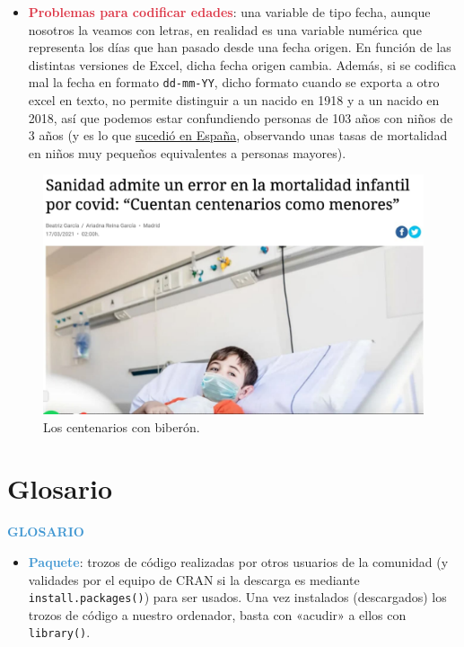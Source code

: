 \documentclass[11pt,]{book}
\providecommand{\tightlist}{%
  \setlength{\itemsep}{0pt}\setlength{\parskip}{0pt}}
\begin{document}
\begin{itemize}
\tightlist
\item
  \textbf{\textcolor{#dc3545}{Problemas para codificar edades}}: una variable de tipo fecha, aunque nosotros la veamos con letras, en realidad es una variable numérica que representa los días que han pasado desde una fecha origen. En función de las distintas versiones de Excel, dicha fecha origen cambia. Además, si se codifica mal la fecha en formato \texttt{dd-mm-YY}, dicho formato cuando se exporta a otro excel en texto, no permite distinguir a un nacido en 1918 y a un nacido en 2018, así que podemos estar confundiendo personas de 103 años con niños de 3 años (y es lo que \href{https://www.niusdiario.es/sociedad/sanidad/sanidad-reconoce-datos-muertes-ninos-covid-erroneos-contabilizaban-centenarios-como-menores_18_3107220241.html}{sucedió en España}, observando unas tasas de mortalidad en niños muy pequeños equivalentes a personas mayores).
\end{itemize}

\begin{figure}

{\centering \includegraphics[width=0.5\linewidth]{./img/excel_edades} 

}

\caption{Los centenarios con biberón.}\label{fig:excel-edades}
\end{figure}

\hypertarget{glosario-1}{%
\section{Glosario}\label{glosario-1}}

\textbf{\textcolor{#4197D2}{GLOSARIO}}

\begin{itemize}
\tightlist
\item
  \textbf{\textcolor{#4197D2}{Paquete}}: trozos de código realizadas por otros usuarios de la comunidad (y validades por el equipo de CRAN si la descarga es mediante \texttt{install.packages()}) para ser usados. Una vez instalados (descargados) los trozos de código a nuestro ordenador, basta con «acudir» a ellos con \texttt{library()}.
\end{itemize}
\end{document}
